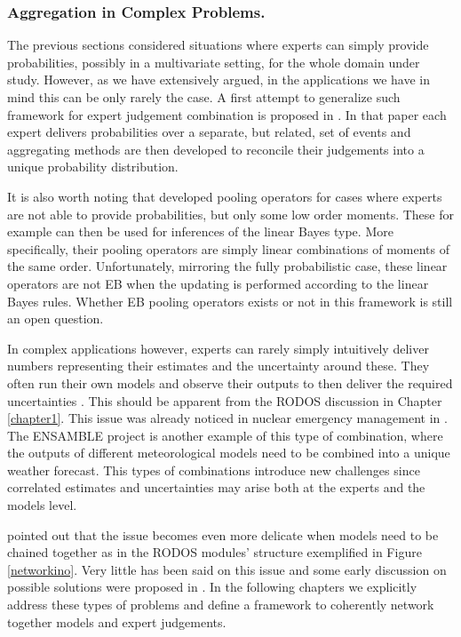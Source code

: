 \subsubsection{Aggregation in Complex Problems.}
The previous sections considered situations where experts can simply provide probabilities, possibly in a multivariate setting, for the whole domain under study. However, as we have extensively argued, in the applications we have in mind this can be only rarely  the case. A first attempt to generalize such framework for expert judgement combination is proposed in \citet{Bordley2009}. In that paper each expert delivers probabilities over a separate, but related, set of events and aggregating methods are then developed to reconcile their judgements into a unique probability distribution.

It is also worth noting that \citet{Wisse2008} developed pooling operators for cases where experts are not able to provide probabilities, but only some low order moments. These for example can then be used for inferences of the linear Bayes type. More specifically, their pooling operators are simply linear combinations of moments of the same order. Unfortunately, mirroring the fully probabilistic case, these linear operators are not  \gls{EB} when the updating is performed according to the linear Bayes rules. Whether \gls{EB} pooling operators exists or not in this framework is still an open question.

In complex applications however, experts can rarely simply intuitively deliver  numbers representing their estimates and the uncertainty around these. They often run their own models and observe their outputs to then deliver the required uncertainties \citep{French2011}. This should be apparent from the \gls{RODOS} discussion in Chapter \ref{chapter1}. This issue was already noticed in nuclear emergency management in \citet{Cooke2000}. The ENSAMBLE project \citep{Krishnamurti2000,Mikkelsen2003} is another example of this type of combination, where the outputs of different meteorological models need to be combined into a unique weather forecast. This types of combinations introduce new challenges since correlated estimates and uncertainties may arise both at the experts and the models level. 

\citet{French2011} pointed out that the issue becomes even more delicate when models need to be chained together as in the \gls{RODOS} modules' structure exemplified in Figure \ref{networkino}. Very little has been said on this issue and some early discussion on possible solutions were proposed in \citet{French1991}.  In the following chapters we explicitly address these types of problems and define a framework to coherently network together models and expert judgements.
 
